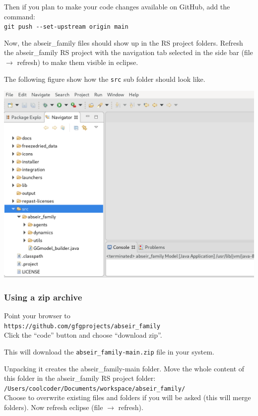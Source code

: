 \documentclass{article}
\begin{document}
Then if you plan to make your code changes available on GitHub, add the command:\\
\verb+git push --set-upstream origin main+

Now, the abseir\_family files should show up in the RS project folders.
Refresh the abseir\_family RS project with the navigation tab selected in the side bar (file $\rightarrow$ refresh) to make them visible in eclipse.

The following figure show how the \verb+src+ sub folder should look like.

\vskip2mm
\noindent
\includegraphics[scale=0.2]{fig_abseir_rs_navigation1}

\vskip2mm

\subsubsection{Using a zip archive}
Point your browser to\\ 
\verb+https://github.com/gfgprojects/abseir_family+\\
Click the ``code'' button and choose ``download zip''.

This will download the \verb+abseir_family-main.zip+ file in your system.

Unpacking it creates the abseir\_family-main folder.
Move the whole content of this folder in the abseir\_family RS project folder:\\  
\verb+/Users/coolcoder/Documents/workspace/abseir_family/+\\
Choose to overwrite existing files and folders if you will be asked (this will merge folders). 
Now refresh eclipse (file $\rightarrow$ refresh).
\end{document}

